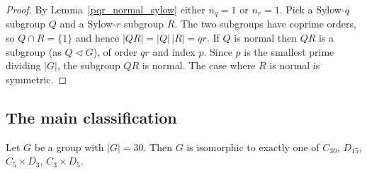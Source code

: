 \begin{proof}
By Lemma~\ref{pqr_normal_sylow} either $n_q = 1$ or $n_r = 1$.
Pick a Sylow-$q$ subgroup $Q$ and a Sylow-$r$ subgroup $R$.
The two subgroups have coprime orders, so $Q \cap R = \{1\}$ and hence
$|QR| = |Q|\,|R| = qr$.
If $Q$ is normal then $QR$ is a subgroup (as $Q \lhd G$),
of order $qr$ and index $p$. Since $p$ is the smallest prime dividing $|G|$,
the subgroup $QR$ is normal. The case where $R$ is normal is symmetric.
\end{proof}

\subsection{The main classification}

\begin{theorem}\label{order_30_classification}
Let $G$ be a group with $|G| = 30$. Then $G$ is isomorphic to exactly one of
$C_{30}$, $D_{15}$, $C_5 \times D_3$, $C_3 \times D_5$.
\end{theorem}

